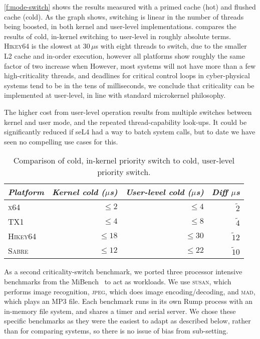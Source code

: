 \autoref{f:mode-switch} shows the results measured with a primed cache (hot) and flushed cache (cold).
As the graph shows, switching is linear in the number of threads being boosted, in both kernel and
user-level implementations.
 compares the results of cold, in-kernel switching to user-level in roughly
absolute terms. \textsc{Hikey64} is the slowest at 30\,\(\mu\)s with eight threads to switch,
due to the smaller L2 cache and
in-order execution, however all platforms show roughly the same factor of two increase when
However, most systems will not have more than a few high-criticality threads, and deadlines for critical control loops in
cyber-physical systems tend to be in the tens of milliseconds, we
conclude that criticality can be implemented at user-level, in line with standard microkernel philosophy.

The higher cost from user-level operation results from  multiple
switches between kernel and user mode, and the repeated
thread-capability look-ups. It could be significantly reduced if seL4
had a way to batch system calls, but to date we have seen no compelling use cases for this.

\begin{table}[t]\centering
    \begin{tabular}{lrrr}\toprule
        \emph{Platform}     & \emph{Kernel cold ($\mu$s)} & \emph{User-level cold ($\mu$s)} & \emph{Diff $\mu$s} \\\midrule
        \textsc{x64}    & $\leq2$ & $\leq4$ & $\tilde2$ \\
        \textsc{TX1}    & $\leq4$ & $\leq8$ & $\tilde4$ \\
        \textsc{Hikey64}    & $\leq18$ & $\leq30$ & $\tilde12$ \\
        \textsc{Sabre}    & $\leq12$ & $\leq22$ & $\tilde10$ \\
        \bottomrule
\end{tabular}
\caption[Comparison of kernel and user-level priority switches]{Comparison of cold, in-kernel
priority switch to cold, user-level priority switch.}
\label{t:cold-prio-switch}
\end{table}


As a second criticality-switch benchmark, we ported three processor intensive 
benchmarks from the MiBench~\citep{Guthaus_REAMB_01} to act as workloads. 
We use \textsc{susan}, which performs image recognition, \textsc{jpeg}, which does image
encoding/decoding, and \textsc{mad}, which plays an MP3 file.
Each benchmark runs in its own Rump process
with an in-memory file system, and shares a timer and serial server.
 We chose these specific
benchmarks as they were the easiest to adapt as described below,
rather than for comparing systems, so there is no issue of bias from sub-setting.

